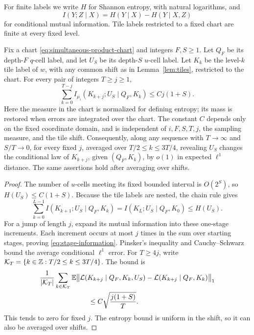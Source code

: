 For finite labels we write \(H\) for Shannon entropy, with natural
logarithms, and
\[
       I(Y;Z\mid X)=H(Y\mid X)-H(Y\mid X,Z)
\]
for conditional mutual information.  Tile labels restricted to a
fixed chart are finite at every fixed level.

\begin{lemma}\label{lem:stage-information}
Fix a chart \eqref{eq:simultaneous-product-chart} and integers
\(F,S\ge1\).  Let \(Q_F\) be its depth-\(F\) \(q\)-cell label,
and let \(U_S\) be its depth-\(S\) \(u\)-cell label.
Let \(K_k\) be the level-\(k\) tile label of \(w\), with any common
shift as in Lemma~\ref{lem:tiles}, restricted to the chart.
For every pair of integers \(T\ge j\ge1\),
\begin{equation}\label{eq:stage-information}
 \sum_{k=0}^{T-j}
       I_{\mu_i}(K_{k+j};U_S\mid Q_F,K_k)
                           \le Cj(1+S).
\end{equation}
Here the measure in the chart is normalized for defining entropy;
its mass is restored when errors are integrated over the chart.
The constant \(C\) depends only on the fixed coordinate domain,
and is independent of \(i,F,S,T,j\), the sampling measure, and
the tile shift.
Consequently, along any sequence with \(T\to\infty\) and
\(S/T\to0\), for every fixed \(j\), averaged over
\(T/2\le k\le3T/4\), revealing \(U_S\) changes the conditional
law of \(K_{k+j}\), given \((Q_F,K_k)\), by \(o(1)\) in expected
\(\ell^1\) distance.  The same assertions hold after averaging
over shifts.
\end{lemma}

\begin{proof}
The number of \(u\)-cells meeting its fixed bounded interval is
\(O(2^S)\), so \(H(U_S)\le C(1+S)\).
Because the tile labels are nested, the chain rule gives
\[
 \sum_{k=0}^{L-1}
       I(K_{k+1};U_S\mid Q_F,K_k)
       = I(K_L;U_S\mid Q_F,K_0)
       \le H(U_S).
\]
For a jump of length \(j\), expand its mutual information into
these one-stage increments.  Each increment occurs at most \(j\)
times in the sum over starting stages, proving
\eqref{eq:stage-information}.  Pinsker's inequality and
Cauchy--Schwarz bound the average conditional \(\ell^1\) error.
For \(T\ge4j\), write
\(\mathcal K_T=\{k\in\mathbb Z:T/2\le k\le3T/4\}\).  The bound is
\[
 \begin{split}
 &\frac1{|\mathcal K_T|}\sum_{k\in\mathcal K_T}
 \E\bigl\|
   \mathcal L(K_{k+j}\mid Q_F,K_k,U_S)
       -\mathcal L(K_{k+j}\mid Q_F,K_k)
 \bigr\|_1\\
 &\hspace{25mm}\le C\sqrt{\frac{j(1+S)}{T}}.
 \end{split}
\]
This tends to zero for fixed \(j\).  The entropy bound is uniform
in the shift, so it can also be averaged over shifts.
\end{proof}

